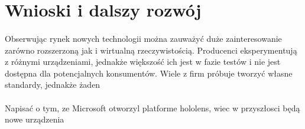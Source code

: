 \newpage
\section{Wnioski i dalszy rozwój}
\paragraph{}
Obserwując rynek nowych technologii można zauważyć duże zainteresowanie zarówno rozszerzoną jak i wirtualną rzeczywistością. Producenci eksperymentują z różnymi urządzeniami, jednakże większość ich jest w fazie testów i nie jest dostępna dla potencjalnych konsumentów.
Wiele z firm próbuje tworzyć własne standardy, jednakże żaden 


\paragraph{}
{\color{red}Napisać o tym, ze Microsoft otworzyl platforme hololens, wiec w przyszłosci będą nowe urządzenia}

